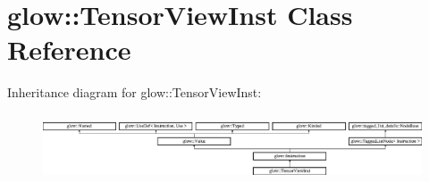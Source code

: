 \hypertarget{classglow_1_1_tensor_view_inst}{}\section{glow\+:\+:Tensor\+View\+Inst Class Reference}
\label{classglow_1_1_tensor_view_inst}
Inheritance diagram for glow\+:\+:Tensor\+View\+Inst\+:\begin{figure}[H]
\begin{center}
\leavevmode
\includegraphics[height=1.991111cm]{classglow_1_1_tensor_view_inst}
\end{center}
\end{figure}
